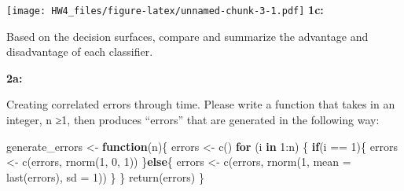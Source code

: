 \documentclass[
]{article}
\newenvironment{Shaded}{\begin{snugshade}}{\end{snugshade}}
\newcommand{\AttributeTok}[1]{\textcolor[rgb]{0.77,0.63,0.00}{#1}}
\newcommand{\CommentTok}[1]{\textcolor[rgb]{0.56,0.35,0.01}{\textit{#1}}}
\newcommand{\ControlFlowTok}[1]{\textcolor[rgb]{0.13,0.29,0.53}{\textbf{#1}}}
\newcommand{\DecValTok}[1]{\textcolor[rgb]{0.00,0.00,0.81}{#1}}
\newcommand{\FunctionTok}[1]{\textcolor[rgb]{0.00,0.00,0.00}{#1}}
\newcommand{\NormalTok}[1]{#1}
\newcommand{\OtherTok}[1]{\textcolor[rgb]{0.56,0.35,0.01}{#1}}
\newcommand{\SpecialCharTok}[1]{\textcolor[rgb]{0.00,0.00,0.00}{#1}}
\newcommand{\StringTok}[1]{\textcolor[rgb]{0.31,0.60,0.02}{#1}}
\begin{document}
\begin{Shaded}
\end{Shaded}

\texttt{[image: HW4\_files/figure-latex/unnamed-chunk-3-1.pdf]}
\textbf{1c:}

Based on the decision surfaces, compare and summarize the advantage and
disadvantage of each classifier.

\textbf{2a:}

Creating correlated errors through time. Please write a function that
takes in an integer, n ≥1, then produces ``errors'' that are generated
in the following way:

\begin{Shaded}
\begin{Highlighting}[]
\NormalTok{generate\_errors }\OtherTok{\textless{}{-}} \ControlFlowTok{function}\NormalTok{(n)\{}
\NormalTok{  errors }\OtherTok{\textless{}{-}} \FunctionTok{c}\NormalTok{()}
  \ControlFlowTok{for}\NormalTok{ (i }\ControlFlowTok{in} \DecValTok{1}\SpecialCharTok{:}\NormalTok{n) \{}
    \ControlFlowTok{if}\NormalTok{(i }\SpecialCharTok{==} \DecValTok{1}\NormalTok{)\{}
\NormalTok{      errors }\OtherTok{\textless{}{-}} \FunctionTok{c}\NormalTok{(errors, }\FunctionTok{rnorm}\NormalTok{(}\DecValTok{1}\NormalTok{, }\DecValTok{0}\NormalTok{, }\DecValTok{1}\NormalTok{))}
\NormalTok{    \}}\ControlFlowTok{else}\NormalTok{\{}
\NormalTok{      errors }\OtherTok{\textless{}{-}} \FunctionTok{c}\NormalTok{(errors, }\FunctionTok{rnorm}\NormalTok{(}\DecValTok{1}\NormalTok{, }\AttributeTok{mean =} \FunctionTok{last}\NormalTok{(errors), }\AttributeTok{sd =} \DecValTok{1}\NormalTok{))}
\NormalTok{    \}}
\NormalTok{  \}}
  \FunctionTok{return}\NormalTok{(errors)}
\NormalTok{\}}
\end{Highlighting}
\end{Shaded}
\end{document}
